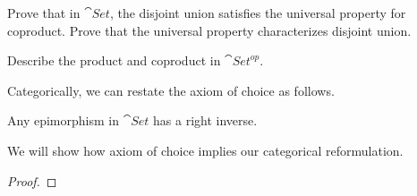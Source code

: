 \documentclass[10pt]{article}
\begin{document}
\begin{problem}
    Prove that in $\cat{Set}$, the disjoint union satisfies the universal property for coproduct. Prove that the universal property characterizes disjoint union.
\end{problem}
\begin{problem}
    Describe the product and coproduct in $\cat{{Set}^{op}}$. 
\end{problem}
\par
Categorically, we can restate the axiom of choice as follows.
\begin{Axiom of choice}
    Any epimorphism in $\cat{Set}$ has a right inverse.
\end{Axiom of choice}
\par
We will show how axiom of choice implies our categorical reformulation.
\begin{proof}
    
\end{proof}
\end{document}
